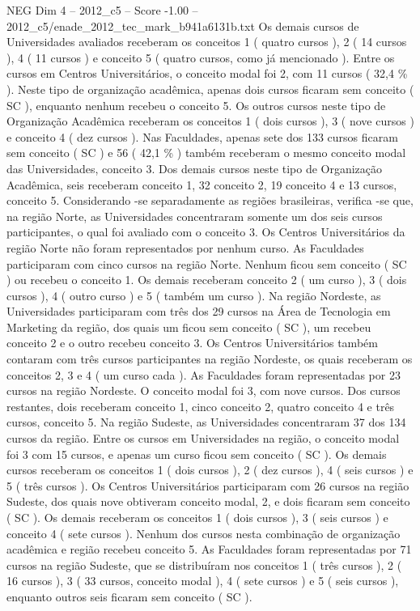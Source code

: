 \begin{textsample}{NEG Dim 4 – 2012\_c5 – Score -1.00 – 2012\_c5/enade\_2012\_tec\_mark\_b941a6131b.txt}
Os demais cursos de Universidades avaliados receberam os conceitos 1 ( quatro cursos ), 2 ( 14 cursos ), 4 ( 11 cursos ) e conceito 5 ( quatro cursos, como já mencionado ).
Entre os cursos em Centros Universitários, o conceito modal foi 2, com 11 cursos ( 32,4 \% ).
Neste tipo de organização acadêmica, apenas dois cursos ficaram sem conceito ( SC ), enquanto nenhum recebeu o conceito 5.
Os outros cursos neste tipo de Organização Acadêmica receberam os conceitos 1 ( dois cursos ), 3 ( nove cursos ) e conceito 4 ( dez cursos ).
Nas Faculdades, apenas sete dos 133 cursos ficaram sem conceito ( SC ) e 56 ( 42,1 \% ) também receberam o mesmo conceito modal das Universidades, conceito 3.
Dos demais cursos neste tipo de Organização Acadêmica, seis receberam conceito 1, 32 conceito 2, 19 conceito 4 e 13 cursos, conceito 5.
Considerando -se separadamente as regiões brasileiras, verifica -se que, na região Norte, as Universidades concentraram somente um dos seis cursos participantes, o qual foi avaliado com o conceito 3.
Os Centros Universitários da região Norte não foram representados por nenhum curso.
As Faculdades participaram com cinco cursos na região Norte.
Nenhum ficou sem conceito ( SC ) ou recebeu o conceito 1.
Os demais receberam conceito 2 ( um curso ), 3 ( dois cursos ), 4 ( outro curso ) e 5 ( também um curso ).
Na região Nordeste, as Universidades participaram com três dos 29 cursos na Área de Tecnologia em Marketing da região, dos quais um ficou sem conceito ( SC ), um recebeu conceito 2 e o outro recebeu conceito 3.
Os Centros Universitários também contaram com três cursos participantes na região Nordeste, os quais receberam os conceitos 2, 3 e 4 ( um curso cada ).
As Faculdades foram representadas por 23 cursos na região Nordeste.
O conceito modal foi 3, com nove cursos.
Dos cursos restantes, dois receberam conceito 1, cinco conceito 2, quatro conceito 4 e três cursos, conceito 5.
Na região Sudeste, as Universidades concentraram 37 dos 134 cursos da região.
Entre os cursos em Universidades na região, o conceito modal foi 3 com 15 cursos, e apenas um curso ficou sem conceito ( SC ).
Os demais cursos receberam os conceitos 1 ( dois cursos ), 2 ( dez cursos ), 4 ( seis cursos ) e 5 ( três cursos ).
Os Centros Universitários participaram com 26 cursos na região Sudeste, dos quais nove obtiveram conceito modal, 2, e dois ficaram sem conceito ( SC ).
Os demais receberam os conceitos 1 ( dois cursos ), 3 ( seis cursos ) e conceito 4 ( sete cursos ).
Nenhum dos cursos nesta combinação de organização acadêmica e região recebeu conceito 5.
As Faculdades foram representadas por 71 cursos na região Sudeste, que se distribuíram nos conceitos 1 ( três cursos ), 2 ( 16 cursos ), 3 ( 33 cursos, conceito modal ), 4 ( sete cursos ) e 5 ( seis cursos ), enquanto outros seis ficaram sem conceito ( SC ).

\end{textsample}
